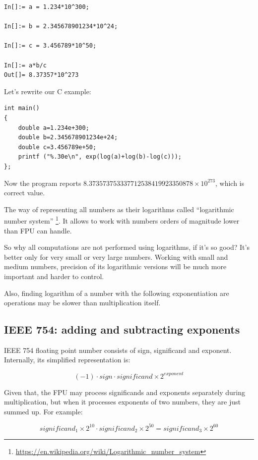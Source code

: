 \begin{lstlisting}[caption=Wolfram Mathematica]
In[]:= a = 1.234*10^300;

In[]:= b = 2.345678901234*10^24;

In[]:= c = 3.456789*10^50;

In[]:= a*b/c
Out[]= 8.37357*10^273
\end{lstlisting}

Let's rewrite our C example:

\begin{lstlisting}[caption=C code]
int main()
{
	double a=1.234e+300;
	double b=2.345678901234e+24;
	double c=3.456789e+50;
	printf ("%.30e\n", exp(log(a)+log(b)-log(c)));
};
\end{lstlisting}

Now the program reports $8.373573753337712538419923350878 \times 10^{273}$, which is correct value.

The way of representing all numbers as their logarithms called ``logarithmic number system''
\footnote{\url{https://en.wikipedia.org/wiki/Logarithmic_number_system}}.
It allows to work with numbers orders of magnitude lower than FPU can handle.

So why all computations are not performed using logarithms, if it's so good?
It's better only for very small or very large numbers.
Working with small and medium numbers, precision of its logarithmic versions will be much more important and harder to control.

Also, finding logarithm of a number with the following exponentiation are operations may be slower than multiplication itself.

\subsection{IEEE 754: adding and subtracting exponents}

IEEE 754 floating point number consists of sign, significand and exponent.
Internally, its simplified representation is:

\begin{equation}
(-1) \cdot sign \cdot significand \times 2^{exponent}
\end{equation}

Given that, the FPU may process significands and exponents separately during multiplication, 
but when it processes exponents of two numbers, they are just summed up.
For example:

\begin{equation}
significand_{1} \times 2^{10} \cdot significand_{2} \times 2^{50} = significand_{3} \times 2^{60}
\end{equation}

